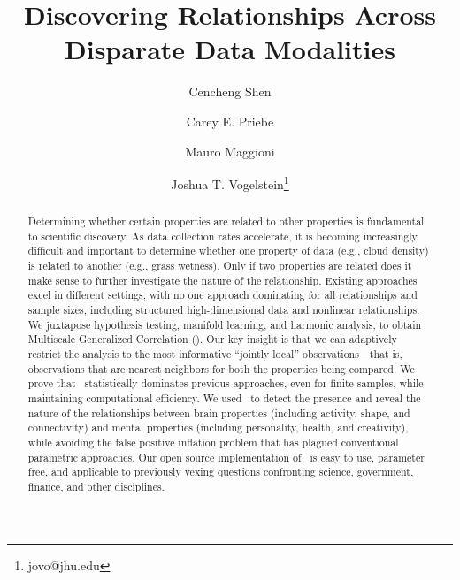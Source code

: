 \documentclass[11pt]{article}
\begin{document}
\def\spacingset#1{\renewcommand{\baselinestretch}%
{#1}\small\normalsize} \spacingset{1}
\title{\vspace{-2em}\bf Discovering Relationships Across Disparate Data Modalities}

\author[1,2]{Cencheng Shen} %
\author[1,3]{Carey E. Priebe}%
\author[3,4,6]{Mauro Maggioni}%
\author[1,5,6]{Joshua T. Vogelstein\thanks{jovo@jhu.edu}}
\maketitle 
\thispagestyle{empty}
\date{}
\vspace{-15pt}
\begin{abstract}
Determining whether certain properties are related to other properties is fundamental to scientific discovery. As data collection rates accelerate, it is becoming increasingly difficult and important to determine whether one property of data (e.g., cloud density) is related to another (e.g., grass wetness). Only if two properties are related does it make sense to further investigate the nature of the relationship. 
Existing approaches excel in different settings, with no one approach dominating for all relationships and sample sizes, including structured high-dimensional data and nonlinear relationships.
We juxtapose hypothesis testing, manifold learning, and harmonic analysis, to obtain Multiscale Generalized Correlation (\Mgc). 
Our key insight is that we can adaptively restrict the analysis to the most informative ``jointly local'' observations---that is, observations that are nearest neighbors for both the properties being compared. 
We prove that \Mgc~statistically dominates previous approaches, even for finite samples, while maintaining computational efficiency.
We used \Mgc~to detect the presence and reveal the nature of the relationships between brain properties (including activity, shape, and connectivity) and mental properties (including personality, health, and creativity), while avoiding  the false positive inflation problem that has plagued conventional parametric approaches. 
Our open source implementation of \Mgc~is easy to use, parameter free, and applicable to previously vexing questions confronting science, government, finance, and other disciplines. 
\end{abstract}
\end{document}
